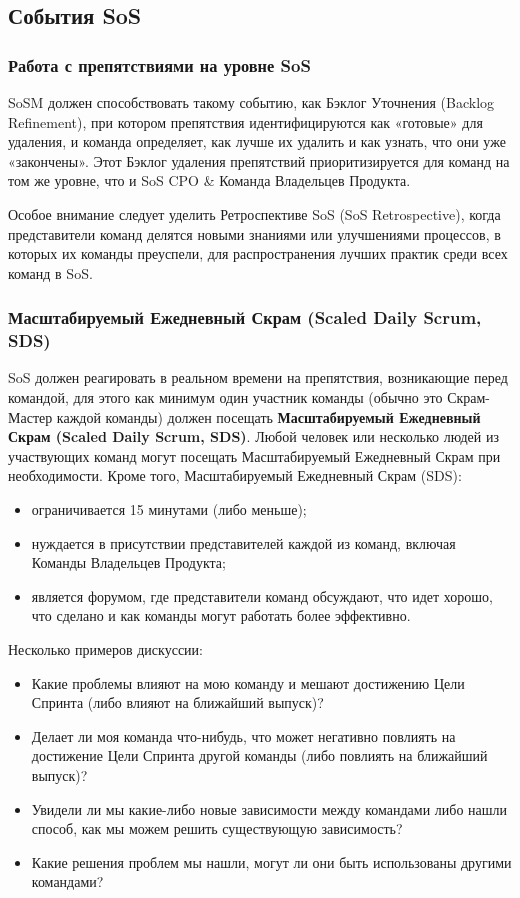 \documentclass[12pt,a4paper,parskip=full]{scrartcl}
\begin{document}
\subsection{События SoS}

\subsubsection{Работа с препятствиями на уровне SoS}

SoSM должен способствовать такому событию, как Бэклог Уточнения (Backlog Refinement), при котором препятствия идентифицируются как «готовые» для удаления, и команда определяет, как лучше их удалить и как узнать, что они уже «закончены». Этот Бэклог удаления препятствий приоритизируется для команд на том же  уровне, что и SoS CPO \& Команда Владельцев Продукта.

Особое внимание следует уделить Ретроспективе  SoS (SoS Retrospective), когда представители команд делятся новыми знаниями или улучшениями процессов, в которых их команды преуспели, для распространения лучших практик среди всех команд в SoS.

\subsubsection{Масштабируемый Ежедневный Скрам (Scaled Daily Scrum, SDS)}

SoS должен реагировать в реальном времени на препятствия, возникающие перед командой, для этого как минимум один участник команды (обычно это Скрам-Мастер каждой команды) должен посещать  \textbf{Масштабируемый Ежедневный Скрам (Scaled Daily Scrum, SDS)}. Любой человек или несколько людей из участвующих команд могут посещать Масштабируемый Ежедневный Скрам при необходимости. Кроме того, Масштабируемый Ежедневный Скрам (SDS):

\begin{itemize}
	\item ограничивается 15 минутами (либо меньше);
	\item нуждается в присутствии представителей каждой из команд, включая Команды Владельцев Продукта; 
	\item является форумом, где представители команд обсуждают, что идет хорошо, что сделано и как команды могут работать более эффективно.
\end{itemize}
	
Несколько примеров дискуссии:
\begin{itemize}
	\item Какие проблемы влияют на мою команду и мешают достижению Цели Спринта (либо влияют на ближайший выпуск)?
	\item Делает ли моя команда что-нибудь, что может негативно повлиять на достижение Цели Спринта другой команды (либо повлиять на ближайший выпуск)?
	\item Увидели ли мы какие-либо новые зависимости между командами либо нашли способ, как мы можем решить существующую зависимость? 
	\item Какие решения проблем мы нашли, могут ли они быть использованы другими командами? 
\end{itemize}
\end{document}
